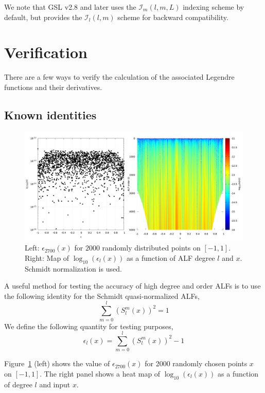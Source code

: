 \documentclass[12pt]{article}
\begin{document}
We note that GSL v2.8 and later uses the $\mathcal{I}_m(l,m,L)$ indexing scheme by default, but provides
the $\mathcal{I}_l(l,m)$ scheme for backward compatibility.

\section{Verification}

There are a few ways to verify the calculation of the associated
Legendre functions and their derivatives.

\subsection{Known identities}

\begin{figure}[ht]
\includegraphics[width=\textwidth]{plots/legeps.png}
\caption{Left: $\epsilon_{2700}(x)$ for $2000$ randomly distributed points
on $[-1,1]$. Right: Map of $\log_{10}(\epsilon_l(x))$ as a function of
ALF degree $l$ and $x$. Schmidt normalization is used.
}
\label{fig:legeps}
\end{figure}

A useful method for testing the accuracy of high degree and order
ALFs is to use the following identity for the Schmidt quasi-normalized
ALFs,
\begin{equation}
\sum_{m=0}^l \left( S_l^m(x) \right)^2 = 1 \label{eqn:S1}
\end{equation}
We define the following quantity for testing purposes,
\begin{equation}
\epsilon_l(x) = \sum_{m=0}^l \left( S_l^m(x) \right)^2 - 1
\end{equation}

Figure~\ref{fig:legeps} (left) shows the value of $\epsilon_{2700}(x)$
for 2000 randomly chosen points $x$ on $[-1,1]$. The right panel shows
a heat map of $\log_{10}(\epsilon_l(x))$ as a function of degree $l$ and
input $x$.
\end{document}

